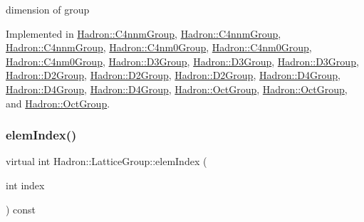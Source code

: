 dimension of group 

Implemented in \mbox{\hyperlink{structHadron_1_1C4nnmGroup_ab40f44381ee83db2364e43bc2c3521e4}{Hadron\+::\+C4nnm\+Group}}, \mbox{\hyperlink{structHadron_1_1C4nnmGroup_ab40f44381ee83db2364e43bc2c3521e4}{Hadron\+::\+C4nnm\+Group}}, \mbox{\hyperlink{structHadron_1_1C4nnmGroup_ab40f44381ee83db2364e43bc2c3521e4}{Hadron\+::\+C4nnm\+Group}}, \mbox{\hyperlink{structHadron_1_1C4nm0Group_adc1a59b08c4fafae324e82e8ded86919}{Hadron\+::\+C4nm0\+Group}}, \mbox{\hyperlink{structHadron_1_1C4nm0Group_adc1a59b08c4fafae324e82e8ded86919}{Hadron\+::\+C4nm0\+Group}}, \mbox{\hyperlink{structHadron_1_1C4nm0Group_adc1a59b08c4fafae324e82e8ded86919}{Hadron\+::\+C4nm0\+Group}}, \mbox{\hyperlink{structHadron_1_1D3Group_a90114a92f0c05cdfd8ff56e33606d3c3}{Hadron\+::\+D3\+Group}}, \mbox{\hyperlink{structHadron_1_1D3Group_a90114a92f0c05cdfd8ff56e33606d3c3}{Hadron\+::\+D3\+Group}}, \mbox{\hyperlink{structHadron_1_1D3Group_a90114a92f0c05cdfd8ff56e33606d3c3}{Hadron\+::\+D3\+Group}}, \mbox{\hyperlink{structHadron_1_1D2Group_a937ab7d9b4b21da1331b0c85728f7db9}{Hadron\+::\+D2\+Group}}, \mbox{\hyperlink{structHadron_1_1D2Group_a937ab7d9b4b21da1331b0c85728f7db9}{Hadron\+::\+D2\+Group}}, \mbox{\hyperlink{structHadron_1_1D2Group_a937ab7d9b4b21da1331b0c85728f7db9}{Hadron\+::\+D2\+Group}}, \mbox{\hyperlink{structHadron_1_1D4Group_a5969c3afe94d4c6ada166f7dc161a355}{Hadron\+::\+D4\+Group}}, \mbox{\hyperlink{structHadron_1_1D4Group_a5969c3afe94d4c6ada166f7dc161a355}{Hadron\+::\+D4\+Group}}, \mbox{\hyperlink{structHadron_1_1D4Group_a5969c3afe94d4c6ada166f7dc161a355}{Hadron\+::\+D4\+Group}}, \mbox{\hyperlink{structHadron_1_1OctGroup_a1db49add38b9263bfd536b3da0cc1566}{Hadron\+::\+Oct\+Group}}, \mbox{\hyperlink{structHadron_1_1OctGroup_a1db49add38b9263bfd536b3da0cc1566}{Hadron\+::\+Oct\+Group}}, and \mbox{\hyperlink{structHadron_1_1OctGroup_a1db49add38b9263bfd536b3da0cc1566}{Hadron\+::\+Oct\+Group}}.

\mbox{\label{structHadron_1_1LatticeGroup_afb8e3ee60de059f75bce1044c694e1e8}} 
\subsubsection{\texorpdfstring{elemIndex()}{elemIndex()}\hspace{0.1cm}{\footnotesize\ttfamily [1/3]}}
{\footnotesize\ttfamily virtual int Hadron\+::\+Lattice\+Group\+::elem\+Index (\begin{DoxyParamCaption}\item[{int}]{index }\end{DoxyParamCaption}) const\hspace{0.3cm}{\ttfamily [pure virtual]}}

